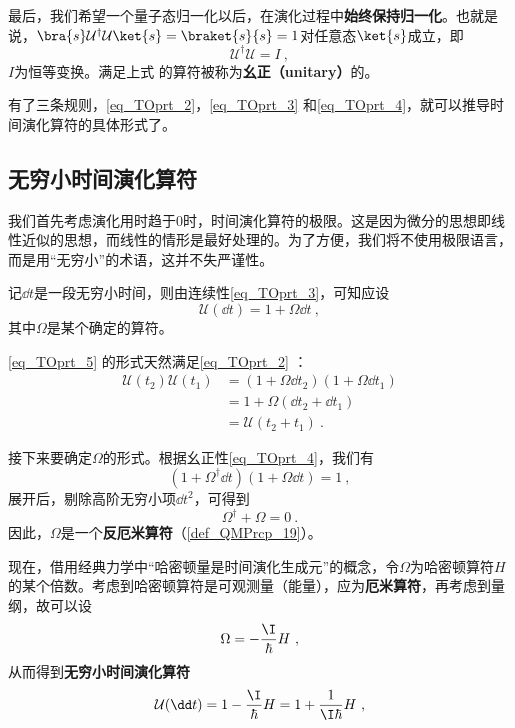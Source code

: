最后，我们希望一个量子态归一化以后，在演化过程中\textbf{始终保持归一化}。也就是说，$\bra{s}\mathcal{U}^\dagger \mathcal{U}\ket{s}=\braket{s}{s}=1$对任意态$\ket{s}$成立，即
\begin{equation}\label{eq_TOprt_4}
\mathcal{U}^\dagger \mathcal{U}=I~,
\end{equation}
$I$为恒等变换。满足上式 的算符被称为\textbf{幺正（unitary）}的。



有了三条规则，\autoref{eq_TOprt_2}，\autoref{eq_TOprt_3} 和\autoref{eq_TOprt_4}，就可以推导时间演化算符的具体形式了。


\subsection{无穷小时间演化算符}

我们首先考虑演化用时趋于$0$时，时间演化算符的极限。这是因为微分的思想即线性近似的思想，而线性的情形是最好处理的。为了方便，我们将不使用极限语言，而是用“无穷小”的术语，这并不失严谨性。

记$\dd t$是一段无穷小时间，则由连续性\autoref{eq_TOprt_3}，可知应设
\begin{equation}\label{eq_TOprt_5}
\mathcal{U}(\dd t) = 1+\Omega \dd t~,
\end{equation}
其中$\Omega$是某个确定的算符。

\autoref{eq_TOprt_5} 的形式天然满足\autoref{eq_TOprt_2} ：
\begin{equation}
\begin{aligned}
\mathcal{U}(t_2)\mathcal{U}(t_1)&=(1+\Omega \dd t_2)(1+\Omega \dd t_1)\\
&=1+\Omega(\dd t_2+\dd t_1)\\
&=\mathcal{U}(t_2+t_1)~.
\end{aligned}
\end{equation}

接下来要确定$\Omega$的形式。根据幺正性\autoref{eq_TOprt_4}，我们有
\begin{equation}
(1+\Omega^\dagger \dd t)(1+\Omega \dd t)=1~,
\end{equation}
展开后，剔除高阶无穷小项$\dd t^2$，可得到
\begin{equation}
\Omega^\dagger + \Omega = 0~.
\end{equation}
因此，$\Omega$是一个\textbf{反厄米算符}（\autoref{def_QMPrcp_19}）。


现在，借用经典力学中“哈密顿量是时间演化生成元”的概念，令$\Omega$为哈密顿算符$H$的某个倍数。考虑到哈密顿算符是可观测量（能量），应为\textbf{厄米算符}，再考虑到量纲，故可以设
\begin{equation}\label{eq_TOprt_6}
\Omega=-\frac{\I}{\hbar}H~,
\end{equation}
从而得到\textbf{无穷小时间演化算符}
\begin{equation}\label{eq_TOprt_11}
\mathcal{U}(\dd t)= 1-\frac{\I}{\hbar}H=1+\frac{1}{\I\hbar}H~,
\end{equation}

